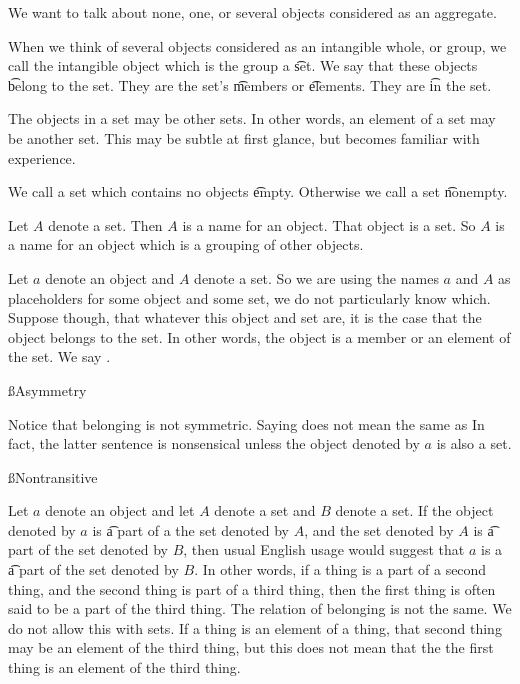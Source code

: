 

We want to talk about none, one, or several objects considered as an aggregate.


When we think of several objects considered as an intangible whole, or group, we call the intangible object which is the group a \t{set}.
We say that these objects \t{belong} to the set.
They are the set's \t{members} or \t{elements}.
They are \t{in} the set.

The objects in a set may be other sets.
In other words, an element of a set may be another set.
This may be subtle at first glance, but becomes familiar with experience.

We call a set which contains no objects \t{empty}.
Otherwise we call a set \t{nonempty}.


Let $A$ denote a set.
Then $A$ is a name for an object.
That object is a set.
So $A$ is a name for an object which is a grouping of other objects.


Let $a$ denote an object and $A$ denote a set.
So we are using the names $a$ and $A$ as placeholders for some object and some set, we do not particularly know which.
Suppose though, that whatever this object and set are, it is the case that the object belongs to the set.
In other words, the object is a member or an element of the set.
We say .

\ss{Asymmetry}

Notice that belonging is not symmetric.
Saying  does not mean the same as 
In fact, the latter sentence is nonsensical unless the object denoted by $a$ is also a set.

\ss{Nontransitive}

Let $a$ denote an object and let $A$ denote a set and $B$ denote a set.
If the object denoted by $a$ is \t{a part of} a the set denoted by $A$, and the set denoted by $A$ is \t{a part of} the set denoted by $B$, then usual English usage would suggest that $a$ is a \t{a part of} the set denoted by $B$.
In other words, if a thing is a part of a second thing, and the second thing is part of a third thing, then the first thing is often said to be a part of the third thing.
The relation of belonging is not the same.
We do not allow this with sets.
If a thing is an element of a thing, that second thing may be an element of the third thing, but this does not mean that the the first thing is an element of the third thing.

